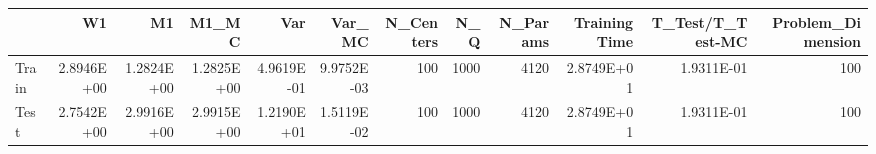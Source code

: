 \begin{tabular}{lrrrrrrrrrrr}
\toprule
{} &         W1 &         M1 &      M1\_MC &        Var &     Var\_MC &  N\_Centers &   N\_Q &  N\_Params &  Training Time &  T\_Test/T\_Test-MC &  Problem\_Dimension \\
\midrule
Train & 2.8946E+00 & 1.2824E+00 & 1.2825E+00 & 4.9619E-01 & 9.9752E-03 &        100 &  1000 &      4120 &     2.8749E+01 &        1.9311E-01 &                100 \\
Test  & 2.7542E+00 & 2.9916E+00 & 2.9915E+00 & 1.2190E+01 & 1.5119E-02 &        100 &  1000 &      4120 &     2.8749E+01 &        1.9311E-01 &                100 \\
\bottomrule
\end{tabular}
